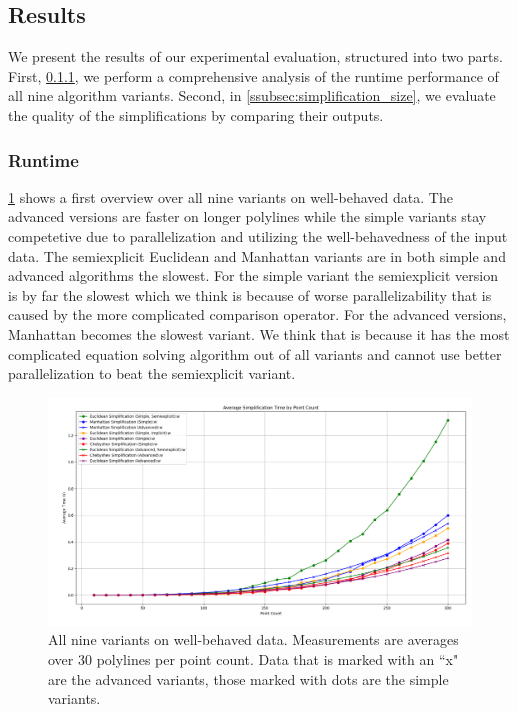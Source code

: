 \subsection{Results}
\label{subsec:results}

We present the results of our experimental evaluation, structured into two parts. First, \cref{ssubsec:runtime}, we perform a comprehensive analysis  of the runtime performance of all nine algorithm variants. Second, in \cref{ssubsec:simplification_size}, we evaluate the quality of the simplifications by comparing their outputs. 

\subsubsection{Runtime}
\label{ssubsec:runtime}

\cref{fig:res_all300w} shows a first overview over all nine variants on well-behaved data. The advanced versions are faster on longer polylines while the simple variants stay competetive due to parallelization and utilizing the well-behavedness of the input data. The semiexplicit Euclidean and Manhattan variants are in both simple and advanced algorithms the slowest. For the simple variant the semiexplicit version is by far the slowest which we think is because of worse parallelizability that is caused by the more complicated comparison operator. For the advanced versions, Manhattan becomes the slowest variant. We think that is because it has the most complicated equation solving algorithm out of all variants and cannot use better parallelization to beat the semiexplicit variant.

\begin{figure}[b]
  \centering
	\includegraphics[scale=0.4]{figures/res_all300w.png}
  \caption{All nine variants on well-behaved data. Measurements are averages over 30 polylines per point count. Data that is marked with an ``x" are the advanced variants, those marked with dots are the simple variants. }
  \label{fig:res_all300w}
\end{figure}

